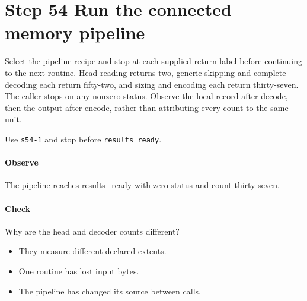 \section{Step 54 Run the connected memory pipeline}\label{cbor-s54}
Select the pipeline recipe and stop at each supplied return label before continuing to the next routine. Head reading returns two, generic skipping and complete decoding each return fifty-two, and sizing and encoding each return thirty-seven. The caller stops on any nonzero status. Observe the local record after decode, then the output after encode, rather than attributing every count to the same unit.

Use \texttt{s54-1} and stop before \texttt{results\_ready}.

\paragraph{Observe} The pipeline reaches results\_ready with zero status and count thirty-seven.

\paragraph{Check} Why are the head and decoder counts different?
\begin{itemize}
  \item[A.] They measure different declared extents.
  \item[B.] One routine has lost input bytes.
  \item[C.] The pipeline has changed its source between calls.
\end{itemize}
